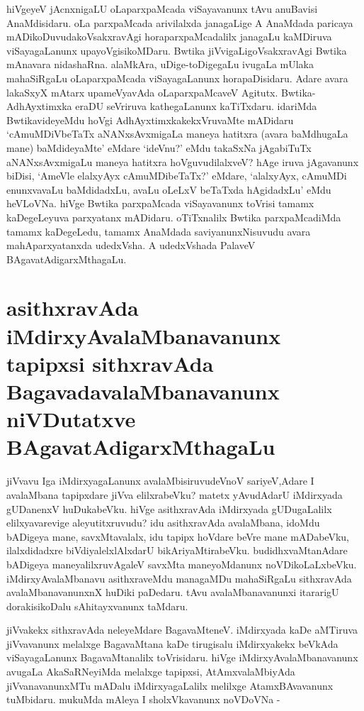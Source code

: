 hiVgeyeV jAcnxnigaLU oLaparxpaMcada viSayavanunx tAvu anuBavisi AnaMdisidaru. oLa parxpaMcada arivilalxda janagaLige A AnaMdada paricaya mADikoDuvudakoVsakxravAgi horaparxpaMcadalilx janagaLu kaMDiruva viSayagaLanunx upayoVgisikoMDaru. Bwtika jiVvigaLigoVsakxravAgi Bwtika mAnavara nidashaRna. alaMkAra, uDige-toDigegaLu ivugaLa mUlaka mahaSiRgaLu oLaparxpaMcada viSayagaLanunx horapaDisidaru. Adare avara lakaSxyX mAtarx upameVyavAda oLaparxpaMcaveV Agitutx. Bwtika-AdhAyxtimxka eraDU seVriruva kathegaLanunx kaTiTxdaru. idariMda BwtikavideyeMdu hoVgi AdhAyxtimxkakekxVruvaMte mADidaru `cAmuMDiVbeTaTx aNANxsAvxmigaLa maneya hatitxra (avara baMdhugaLa mane) baMdideyaMte' eMdare `ideVnu?' eMdu takaSxNa jAgabiTuTx aNANxsAvxmigaLu maneya hatitxra hoVguvudilalxveV? hAge iruva jAgavanunx biDisi, `AmeVle elalxyAyx cAmuMDibeTaTx?' eMdare, `alalxyAyx, cAmuMDi enunxvavaLu baMdidadxLu, avaLu oLeLxV beTaTxda hAgidadxLu' eMdu heVLoVNa. hiVge Bwtika parxpaMcada viSayavanunx toVrisi tamamx kaDegeLeyuva parxyatanx mADidaru. oTiTxnalilx Bwtika parxpaMcadiMda tamamx kaDegeLedu, tamamx AnaMdada saviyanunxNisuvudu avara mahAparxyatanxda udedxVsha. A udedxVshada PalaveV BAgavatAdigarxMthagaLu.

\section*{asithxravAda iMdirxyAvalaMbanavanunx tapipxsi sithxravAda BagavadavalaMbanavanunx niVDutatxve BAgavatAdigarxMthagaLu}

jiVvavu Iga iMdirxyagaLanunx avalaMbisiruvudeVnoV sariyeV,‌Adare I avalaMbana tapipxdare jiVva elilxrabeVku? matetx yAvudAdarU iMdirxyada gUDanenxV huDukabeVku. hiVge asithxravAda iMdirxyada gUDugaLalilx elilxyavarevige aleyutitxruvudu? idu asithxravAda avalaMbana, idoMdu bADigeya mane, savxMtavalalx, idu tapipx hoVdare beVre mane mADabeVku, ilalxdidadxre biVdiyalelxlAlxdarU bikAriyaMtirabeVku. budidhxvaMtanAdare bADigeya maneyalilxruvAgaleV savxMta maneyoMdanunx noVDikoLaLxbeVku. iMdirxyAvalaMbanavu asithxraveMdu managaMDu mahaSiRgaLu sithxravAda avalaMbanavanunxnX huDiki paDedaru. tAvu avalaMbanavanunxi itararigU dorakisikoDalu sAhitayxvanunx taMdaru.

jiVvakekx sithxravAda neleyeMdare BagavaMteneV. iMdirxyada kaDe aMTiruva jiVvavanunx  melalxge BagavaMtana kaDe tirugisalu iMdirxyakekx beVkAda viSayagaLanunx BagavaMtanalilx toVrisidaru. hiVge iMdirxyAvalaMbanavanunx  avugaLa AkaSaRNeyiMda melalxge tapipxsi, AtAmxvalaMbiyAda jiVvanavanunxMTu mADalu iMdirxyagaLalilx melilxge AtamxBAvavanunx tuMbidaru. mukuMda mAleya I sholxVkavanunx noVDoVNa -

